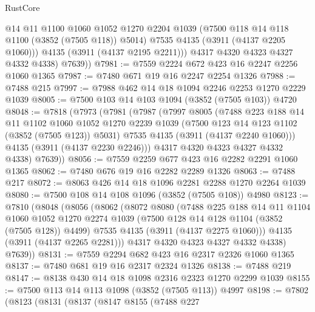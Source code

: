 \begin{lexlean}{RustCore}
\begin{coremodule}
              @14
              @11
              @1100
              @1060
              @1052
              @1270
              @2204
              @1039
              (@7500 @118 @14 @118 @1100 (@3852 (@7505 @118)) @5014)
              @7535
              @4135
              (@3911 (@4137 @2205 @1060)))
            @4135
            (@3911 (@4137 @2195 @2211)))
          @4317
          @4320
          @4323
          @4327
          @4332
          @4338)
        @7639))
@7981 := @7559 @2224 @672 @423 @16 @2247 @2256 @1060 @1365
@7987 := @7480 @671 @19 @16 @2247 @2254 @1326
@7988 := @7488 @215
@7997 := @7988 @462 @14 @18 @1094 @2246 @2253 @1270 @2229 @1039
@8005 := @7500 @103 @14 @103 @1094 (@3852 (@7505 @103)) @4720
@8048 := @7818
    (@7973
      (@7981
        (@7987
          (@7997
            @8005
            (@7488
              @223
              @188
              @14
              @11
              @1102
              @1060
              @1052
              @1270
              @2239
              @1039
              (@7500 @123 @14 @123 @1102 (@3852 (@7505 @123)) @5031)
              @7535
              @4135
              (@3911 (@4137 @2240 @1060)))
            @4135
            (@3911 (@4137 @2230 @2246)))
          @4317
          @4320
          @4323
          @4327
          @4332
          @4338)
        @7639))
@8056 := @7559 @2259 @677 @423 @16 @2282 @2291 @1060 @1365
@8062 := @7480 @676 @19 @16 @2282 @2289 @1326
@8063 := @7488 @217
@8072 := @8063 @426 @14 @18 @1096 @2281 @2288 @1270 @2264 @1039
@8080 := @7500 @108 @14 @108 @1096 (@3852 (@7505 @108)) @4980
@8123 := @7810
    (@8048
      (@8056
        (@8062
          (@8072
            @8080
            (@7488
              @225
              @188
              @14
              @11
              @1104
              @1060
              @1052
              @1270
              @2274
              @1039
              (@7500 @128 @14 @128 @1104 (@3852 (@7505 @128)) @4499)
              @7535
              @4135
              (@3911 (@4137 @2275 @1060)))
            @4135
            (@3911 (@4137 @2265 @2281)))
          @4317
          @4320
          @4323
          @4327
          @4332
          @4338)
        @7639))
@8131 := @7559 @2294 @682 @423 @16 @2317 @2326 @1060 @1365
@8137 := @7480 @681 @19 @16 @2317 @2324 @1326
@8138 := @7488 @219
@8147 := @8138 @430 @14 @18 @1098 @2316 @2323 @1270 @2299 @1039
@8155 := @7500 @113 @14 @113 @1098 (@3852 (@7505 @113)) @4997
@8198 := @7802
    (@8123
      (@8131
        (@8137
          (@8147
            @8155
            (@7488
              @227

\end{coremodule}
\end{lexlean}
